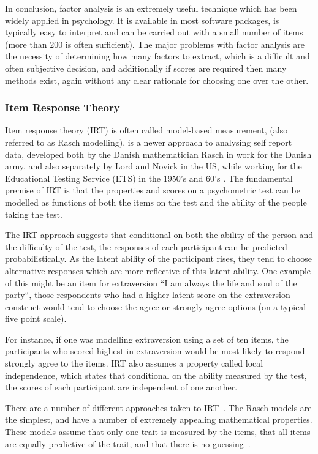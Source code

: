 In conclusion, factor analysis is an extremely useful technique which has been widely applied in psychology. It is available in most software packages, is typically easy to interpret and can be carried out with a small number of items (more than 200 is often sufficient). The major problems with factor analysis are the necessity of determining how many factors to extract, which is a difficult and often subjective decision, and additionally if scores are required then many methods exist, again without any clear rationale for choosing one over the other.  

\subsubsection{Item Response Theory}
\label{sec:item-response-theory}
Item response theory (IRT) is often called model-based measurement\cite{fischer1995rasch}, (also referred to as Rasch modelling), is a newer approach to analysing self report data, developed both by the Danish mathematician Rasch in work for the Danish army, and also separately by Lord and Novick in the US, while working for the Educational Testing Service (ETS) in the 1950's and 60's \cite{van1997handbook}.
The fundamental premise of IRT is that the properties and scores on a psychometric test can be modelled as functions of both the items on the test and the ability of the people taking the test.

The IRT approach suggests that conditional on both the ability of the person and the difficulty of the test, the responses of each participant can be predicted probabilistically. As the latent ability of the participant rises, they tend to choose alternative responses which are more reflective of this latent ability. One example of this might be an item for extraversion ``I am always the life and soul of the party``, those respondents who had a higher latent score on the extraversion construct would tend to choose the agree or strongly agree options (on a typical five point scale). 

For instance, if one was modelling extraversion using a set of ten items, the participants who scored highest in extraversion would be most likely to respond strongly agree to the items.  IRT also assumes a property called local independence, which states that conditional on the ability measured by the test, the scores of each participant are independent of one another.

There are a number of different approaches taken to IRT~\cite{van1997handbook,fischer1995rasch}. The  Rasch models are the simplest, and have a number of extremely appealing mathematical properties. These models assume that only one trait is measured by the items, that all items are equally predictive of the trait, and that there is no guessing~\cite{van1997handbook}.

